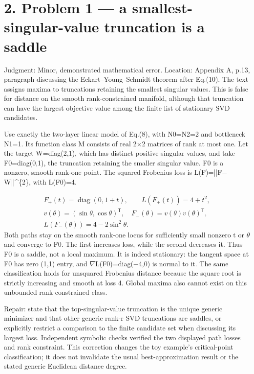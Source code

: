 \documentclass[10pt]{article}
\begin{document}
\section*{2. Problem 1 — a smallest-singular-value truncation is a saddle}
Judgment: Minor, demonstrated mathematical error. Location: Appendix A, p.13, paragraph discussing the Eckart–Young–Schmidt theorem after Eq.(10). The text assigns maxima to truncations retaining the smallest singular values. This is false for distance on the smooth rank-constrained manifold, although that truncation can have the largest objective value among the finite list of stationary SVD candidates.\par
Use exactly the two-layer linear model of Eq.(8), with N0=N2=2 and bottleneck N1=1. Its function class M consists of real 2\(\times\)2 matrices of rank at most one. Let the target W=diag(2,1), which has distinct positive singular values, and take F0=diag(0,1), the truncation retaining the smaller singular value. F0 is a nonzero, smooth rank-one point. The squared Frobenius loss is L(F)=||F\(-\)W||\textasciicircum{}\{2\}, with L(F0)=4.\par
\[\begin{gathered} F_+(t)=\operatorname{diag}(0,1+t),\qquad L(F_+(t))=4+t^2,\\ v(\theta)=(\sin\theta,\cos\theta)^{\mathsf T},\quad F_-(\theta)=v(\theta)v(\theta)^{\mathsf T},\\L(F_-(\theta))=4-2\sin^2\theta.\end{gathered}\] Both paths stay on the smooth rank-one locus for sufficiently small nonzero t or \(\theta\) and converge to F0. The first increases loss, while the second decreases it. Thus F0 is a saddle, not a local maximum. It is indeed stationary: the tangent space at F0 has zero (1,1) entry, and \(\nabla\)L(F0)=diag(\(-\)4,0) is normal to it. The same classification holds for unsquared Frobenius distance because the square root is strictly increasing and smooth at loss 4. Global maxima also cannot exist on this unbounded rank-constrained class.\par
Repair: state that the top-singular-value truncation is the unique generic minimizer and that other generic rank-r SVD truncations are saddles, or explicitly restrict a comparison to the finite candidate set when discussing its largest loss. Independent symbolic checks verified the two displayed path losses and rank constraint. This correction changes the toy example’s critical-point classification; it does not invalidate the usual best-approximation result or the stated generic Euclidean distance degree.\par
\end{document}
